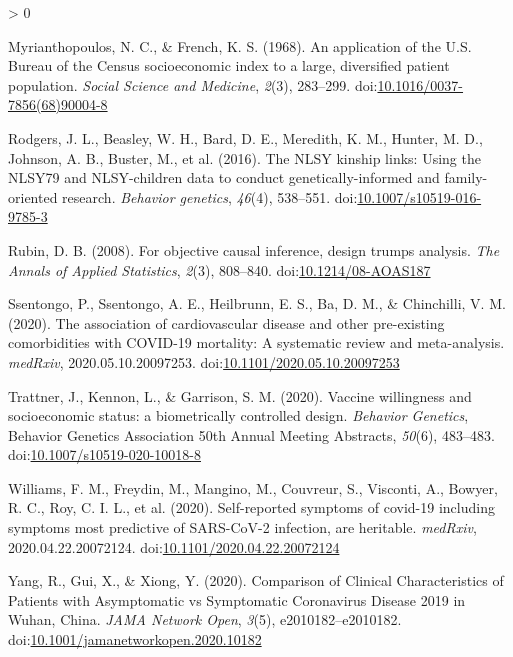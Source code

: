 \documentclass[10pt,a4paper,onecolumn]{article}
\newlength{\cslhangindent}
\newenvironment{CSLReferences}[2] %
 {%
  \setlength{\parindent}{0pt}
  \ifodd #1 \everypar{\setlength{\hangindent}{\cslhangindent}}\ignorespaces\fi
  \ifnum #2 > 0
  \setlength{\parskip}{#2\baselineskip}
  \fi
 }%
 {}
\begin{document}
\begin{CSLReferences}{1}{0}
\leavevmode\hypertarget{ref-myrianthopoulos1968}{}%
Myrianthopoulos, N. C., \& French, K. S. (1968). An application of the
U.S. Bureau of the Census socioeconomic index to a large, diversified
patient population. \emph{Social Science and Medicine}, \emph{2}(3),
283--299.
doi:\href{https://doi.org/10.1016/0037-7856(68)90004-8}{10.1016/0037-7856(68)90004-8}

\leavevmode\hypertarget{ref-rodgers2016}{}%
Rodgers, J. L., Beasley, W. H., Bard, D. E., Meredith, K. M., Hunter, M.
D., Johnson, A. B., Buster, M., et al. (2016). The NLSY kinship links:
Using the NLSY79 and NLSY-children data to conduct genetically-informed
and family-oriented research. \emph{Behavior genetics}, \emph{46}(4),
538--551.
doi:\href{https://doi.org/10.1007/s10519-016-9785-3}{10.1007/s10519-016-9785-3}

\leavevmode\hypertarget{ref-rubin2008}{}%
Rubin, D. B. (2008). For objective causal inference, design trumps
analysis. \emph{The Annals of Applied Statistics}, \emph{2}(3),
808--840.
doi:\href{https://doi.org/10.1214/08-AOAS187}{10.1214/08-AOAS187}

\leavevmode\hypertarget{ref-ssentongo2020}{}%
Ssentongo, P., Ssentongo, A. E., Heilbrunn, E. S., Ba, D. M., \&
Chinchilli, V. M. (2020). The association of cardiovascular disease and
other pre-existing comorbidities with COVID-19 mortality: A systematic
review and meta-analysis. \emph{medRxiv}, 2020.05.10.20097253.
doi:\href{https://doi.org/10.1101/2020.05.10.20097253}{10.1101/2020.05.10.20097253}

\leavevmode\hypertarget{ref-jonathantrattner2020}{}%
Trattner, J., Kennon, L., \& Garrison, S. M. (2020). Vaccine willingness
and socioeconomic status: a biometrically controlled design.
\emph{Behavior Genetics}, Behavior Genetics Association 50th Annual
Meeting Abstracts, \emph{50}(6), 483--483.
doi:\href{https://doi.org/10.1007/s10519-020-10018-8}{10.1007/s10519-020-10018-8}

\leavevmode\hypertarget{ref-williams2020}{}%
Williams, F. M., Freydin, M., Mangino, M., Couvreur, S., Visconti, A.,
Bowyer, R. C., Roy, C. I. L., et al. (2020). Self-reported symptoms of
covid-19 including symptoms most predictive of SARS-CoV-2 infection, are
heritable. \emph{medRxiv}, 2020.04.22.20072124.
doi:\href{https://doi.org/10.1101/2020.04.22.20072124}{10.1101/2020.04.22.20072124}

\leavevmode\hypertarget{ref-yang2020}{}%
Yang, R., Gui, X., \& Xiong, Y. (2020). Comparison of Clinical
Characteristics of Patients with Asymptomatic vs Symptomatic Coronavirus
Disease 2019 in Wuhan, China. \emph{JAMA Network Open}, \emph{3}(5),
e2010182--e2010182.
doi:\href{https://doi.org/10.1001/jamanetworkopen.2020.10182}{10.1001/jamanetworkopen.2020.10182}

\end{CSLReferences}
\end{document}
